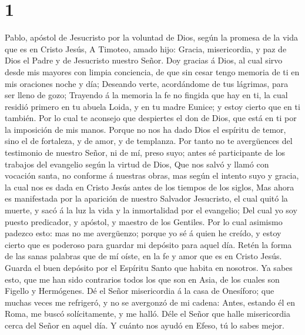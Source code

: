 \hypertarget{section}{%
\section{1}\label{section}}

 Pablo, apóstol de Jesucristo por la voluntad de Dios,
según la promesa de la vida que es en Cristo Jesús,  A
Timoteo, amado hijo: Gracia, misericordia, y paz de Dios el Padre y de
Jesucristo nuestro Señor.  Doy gracias á Dios, al cual
sirvo desde mis mayores con limpia conciencia, de que sin cesar tengo
memoria de ti en mis oraciones noche y día;  Deseando
verte, acordándome de tus lágrimas, para ser lleno de gozo;
 Trayendo á la memoria la fe no fingida que hay en ti, la
cual residió primero en tu abuela Loida, y en tu madre Eunice; y estoy
cierto que en ti también.  Por lo cual te aconsejo que
despiertes el don de Dios, que está en ti por la imposición de mis
manos.  Porque no nos ha dado Dios el espíritu de temor,
sino el de fortaleza, y de amor, y de templanza.  Por
tanto no te avergüences del testimonio de nuestro Señor, ni de mí, preso
suyo; antes sé participante de los trabajos del evangelio según la
virtud de Dios,  Que nos salvó y llamó con vocación santa,
no conforme á nuestras obras, mas según el intento suyo y gracia, la
cual nos es dada en Cristo Jesús antes de los tiempos de los siglos,
 Mas ahora es manifestada por la aparición de nuestro
Salvador Jesucristo, el cual quitó la muerte, y sacó á la luz la vida y
la inmortalidad por el evangelio;  Del cual yo soy puesto
predicador, y apóstol, y maestro de los Gentiles.  Por lo
cual asimismo padezco esto: mas no me avergüenzo; porque yo sé á quien
he creído, y estoy cierto que es poderoso para guardar mi depósito para
aquel día.  Retén la forma de las sanas palabras que de
mí oíste, en la fe y amor que es en Cristo Jesús.  Guarda
el buen depósito por el Espíritu Santo que habita en nosotros.
 Ya sabes esto, que me han sido contrarios todos los que
son en Asia, de los cuales son Figello y Hermógenes.  Dé
el Señor misericordia á la casa de Onesíforo; que muchas veces me
refrigeró, y no se avergonzó de mi cadena:  Antes,
estando él en Roma, me buscó solícitamente, y me halló. 
Déle el Señor que halle misericordia cerca del Señor en aquel día. Y
cuánto nos ayudó en Efeso, tú lo sabes mejor.

